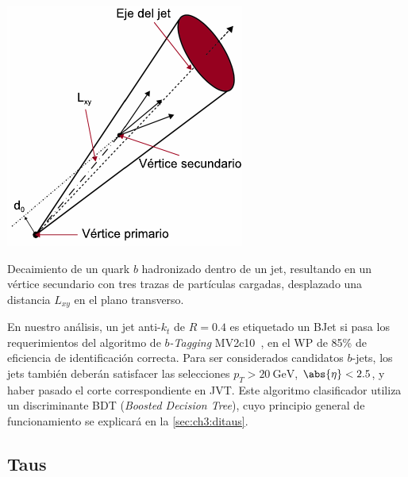 \begin{marginfigure}
    \includegraphics[width=\linewidth]{Assets/Images/secondary_vertex.pdf}
    \caption{Decaimiento de un quark $b$ hadronizado dentro de un jet, resultando en un vértice secundario con tres trazas de partículas cargadas, desplazado una distancia $L_{xy}$ en el plano transverso.}
    \label{fig:ch3:secondary_vertex}
\end{marginfigure}

En nuestro análisis, un jet anti-$k_t$ de $R = 0.4$ es etiquetado un BJet si pasa los requerimientos del algoritmo de \textit{$b$-Tagging} MV2c10~\cite{Aad2019}, en el WP de 85\% de eficiencia de identificación correcta. Para ser considerados candidatos $b$-jets, los jets también deberán satisfacer las selecciones $p_T > \SI{20}{\GeV}$, $\abs{\eta} < 2.5$, y haber pasado el corte correspondiente en JVT. Este algoritmo clasificador utiliza un discriminante BDT (\textit{Boosted Decision Tree}), cuyo principio general de funcionamiento se explicará en la \cref{sec:ch3:ditaus}.



\subsection{Taus} \label{sec:ch3:single-taus}

